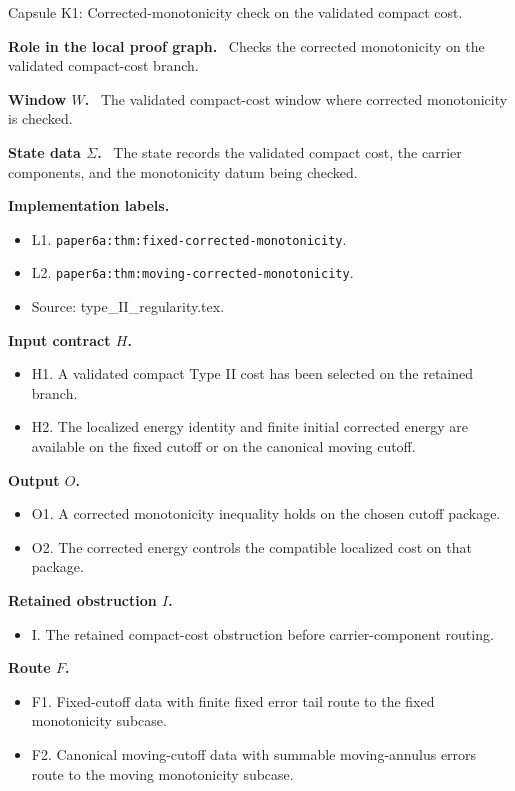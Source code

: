 \documentclass[11pt]{amsart}
\newcommand{\capsulefield}[1]{\par\smallskip\noindent\textbf{#1.}\ }
\begin{document}
\begin{proofcapsule}{Capsule K1: Corrected-monotonicity check on the validated compact cost.}
  \capsulefield{Role in the local proof graph}
  Checks the corrected monotonicity on the validated compact-cost branch.

  \capsulefield{Window \(W\)}
The validated compact-cost window where corrected monotonicity is checked.

  \capsulefield{State data \(\Sigma\)}
The state records the validated compact cost, the carrier components, and the monotonicity datum being checked.

  \capsulefield{Implementation labels}
  \begin{itemize}[leftmargin=1.8em]
  \item L1. \texttt{paper6a:thm:fixed-corrected-monotonicity}.
  \item L2. \texttt{paper6a:thm:moving-corrected-monotonicity}.
  \item Source: type\_II\_regularity.tex.
  \end{itemize}

  \capsulefield{Input contract \(H\)}
  \begin{itemize}[leftmargin=1.8em]
  \item H1. A validated compact Type II cost has been selected on the retained branch.
  \item H2. The localized energy identity and finite initial corrected energy are available on the fixed cutoff or on the canonical moving cutoff.
  \end{itemize}

  \capsulefield{Output \(O\)}
  \begin{itemize}[leftmargin=1.8em]
  \item O1. A corrected monotonicity inequality holds on the chosen cutoff package.
  \item O2. The corrected energy controls the compatible localized cost on that package.
  \end{itemize}

  \capsulefield{Retained obstruction \(I\)}
  \begin{itemize}[leftmargin=1.8em]
  \item I. The retained compact-cost obstruction before carrier-component routing.
  \end{itemize}

  \capsulefield{Route \(F\)}
  \begin{itemize}[leftmargin=1.8em]
  \item F1. Fixed-cutoff data with finite fixed error tail route to the fixed monotonicity subcase.
  \item F2. Canonical moving-cutoff data with summable moving-annulus errors route to the moving monotonicity subcase.
  \end{itemize}


\end{proofcapsule}
\end{document}
